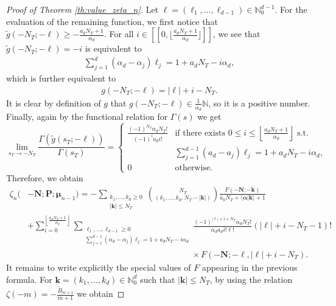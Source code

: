 \documentclass[a4paper,12pt]{article}
\theoremstyle{definition}
\numberwithin{equation}{section}
\begin{document}
\begin{proof}[Proof of Theorem \ref{th:value_zeta_n}]
Let $\boldsymbol{\ell}=(\ell_1,\ldots,\ell_{d-1}) \in \mathbb{N}_0^{d-1}$. For the evaluation of the remaining function, we first notice that $\widetilde{g}(-N_T;-\boldsymbol{\ell}) \geq -\frac{a_dN_T+1}{\alpha_d}$. For all $i \in [\![ 0,\lfloor \frac{a_dN_T+1}{\alpha_d} \rfloor ]\!]$, we see that
$\widetilde{g}(-N_T;-\boldsymbol{\ell})=-i$ is equivalent to
\begin{align*}
\sum_{j=1}^{d} (\alpha_d-\alpha_j) \ell_j=1+a_dN_T-i\alpha_d,
\end{align*}
which is further equivalent to
\begin{align*}
    g(-N_T;-\boldsymbol{\ell})=|\boldsymbol{\ell}|+i-N_T.
\end{align*}
It is clear by definition of $g$ that $g(-N_T;-\boldsymbol{\ell}) \in \frac{1}{\alpha_d}\mathbb{N}$, so it is a positive number. Finally, again by the functional relation for $\Gamma(s)$ we get
\[
    \lim_{s_T \to -N_T} \frac{\Gamma(\widetilde{g}(s_T;-\boldsymbol{\ell}))}{\Gamma(s_T)} =
    \begin{cases}
        \frac{(-1)^{N_T}\alpha_dN_T!}{(-1)^ia_di!} & \text{if there exists } 0 \leq i \leq \left\lfloor \frac{a_dN_T+1}{\alpha_d}\right\rfloor \text{ s.t.} \\
        & \sum_{j=1}^{d-1} (a_d-a_j) \ell_j=1+a_dN_T-i\alpha_d, \\
        0 &\text{otherwise.}
    \end{cases}
\]
Therefore, we obtain
\begin{align*}
    \zeta_{n}(&-\mathbf{N};\mathbf{P};\boldsymbol{\mu}_{n-1})=-\sum_{\substack{k_1,\ldots,k_d \geq 0 \\ |\mathbf{k}| \leq N_T}} \binom{N_T}{(k_1,\ldots,k_d,N_T-|\mathbf{k}|)} \frac{F(-\mathbf{N};-\mathbf{k})}{a_0N_T+\langle \boldsymbol{\alpha}|\mathbf{k}\rangle+1} \\
    &+ \sum_{i=0}^{\left\lfloor \frac{a_dN_T+1}{\alpha_d}\right\rfloor} \sum_{\substack{\ell_1,\ldots,\ell_{d-1} \geq 0 \\ \sum_{j=1}^{d-1} (\alpha_d-\alpha_j) \ell_j=1+a_dN_T-i\alpha_d}} \frac{(-1)^{|\boldsymbol{\ell}|+i+N_T}\alpha_dN_T!}{\alpha_da_di!\boldsymbol{\ell}!}(|\boldsymbol{\ell}|+i-N_T-1)! \\
    & \hspace{231pt} \times F(-\mathbf{N};-\boldsymbol{\ell},|\boldsymbol{\ell}|+i-N_T).
\end{align*}
It remains to write explicitly the special values of $F$ appearing in the previous formula. For $\mathbf{k}=(k_1,\ldots,k_d) \in \mathbb{N}_0^d$ such that $|\mathbf{k}|\leq N_T$, by using the relation $\zeta(-m)=-\frac{\widetilde{B}_{m+1}}{m+1}$ we obtain

\end{proof}
\end{document}
